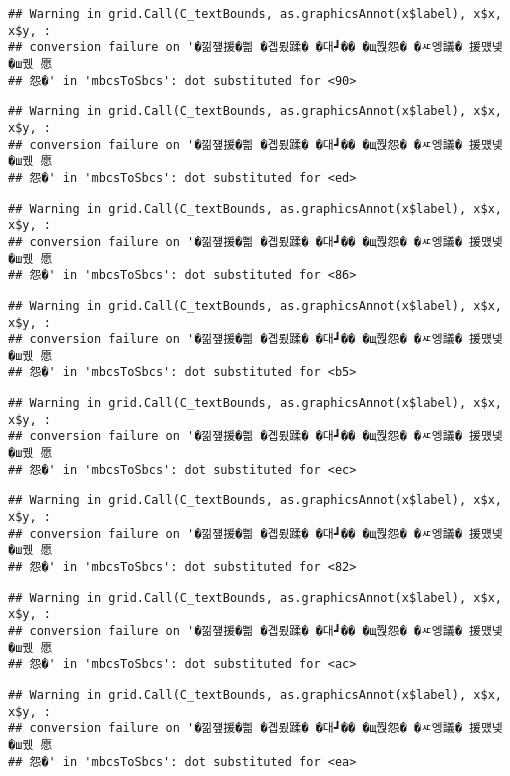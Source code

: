 \documentclass[
]{article}
\begin{document}
\begin{verbatim}
## Warning in grid.Call(C_textBounds, as.graphicsAnnot(x$label), x$x, x$y, :
## conversion failure on '�낆쟾援�쁾 �곕룄蹂� �대┛�� �щ쭩怨� �ㅼ엥議� 援먰넻�ш퀬 愿
## 怨�' in 'mbcsToSbcs': dot substituted for <90>
\end{verbatim}

\begin{verbatim}
## Warning in grid.Call(C_textBounds, as.graphicsAnnot(x$label), x$x, x$y, :
## conversion failure on '�낆쟾援�쁾 �곕룄蹂� �대┛�� �щ쭩怨� �ㅼ엥議� 援먰넻�ш퀬 愿
## 怨�' in 'mbcsToSbcs': dot substituted for <ed>
\end{verbatim}

\begin{verbatim}
## Warning in grid.Call(C_textBounds, as.graphicsAnnot(x$label), x$x, x$y, :
## conversion failure on '�낆쟾援�쁾 �곕룄蹂� �대┛�� �щ쭩怨� �ㅼ엥議� 援먰넻�ш퀬 愿
## 怨�' in 'mbcsToSbcs': dot substituted for <86>
\end{verbatim}

\begin{verbatim}
## Warning in grid.Call(C_textBounds, as.graphicsAnnot(x$label), x$x, x$y, :
## conversion failure on '�낆쟾援�쁾 �곕룄蹂� �대┛�� �щ쭩怨� �ㅼ엥議� 援먰넻�ш퀬 愿
## 怨�' in 'mbcsToSbcs': dot substituted for <b5>
\end{verbatim}

\begin{verbatim}
## Warning in grid.Call(C_textBounds, as.graphicsAnnot(x$label), x$x, x$y, :
## conversion failure on '�낆쟾援�쁾 �곕룄蹂� �대┛�� �щ쭩怨� �ㅼ엥議� 援먰넻�ш퀬 愿
## 怨�' in 'mbcsToSbcs': dot substituted for <ec>
\end{verbatim}

\begin{verbatim}
## Warning in grid.Call(C_textBounds, as.graphicsAnnot(x$label), x$x, x$y, :
## conversion failure on '�낆쟾援�쁾 �곕룄蹂� �대┛�� �щ쭩怨� �ㅼ엥議� 援먰넻�ш퀬 愿
## 怨�' in 'mbcsToSbcs': dot substituted for <82>
\end{verbatim}

\begin{verbatim}
## Warning in grid.Call(C_textBounds, as.graphicsAnnot(x$label), x$x, x$y, :
## conversion failure on '�낆쟾援�쁾 �곕룄蹂� �대┛�� �щ쭩怨� �ㅼ엥議� 援먰넻�ш퀬 愿
## 怨�' in 'mbcsToSbcs': dot substituted for <ac>
\end{verbatim}

\begin{verbatim}
## Warning in grid.Call(C_textBounds, as.graphicsAnnot(x$label), x$x, x$y, :
## conversion failure on '�낆쟾援�쁾 �곕룄蹂� �대┛�� �щ쭩怨� �ㅼ엥議� 援먰넻�ш퀬 愿
## 怨�' in 'mbcsToSbcs': dot substituted for <ea>
\end{verbatim}
\end{document}
